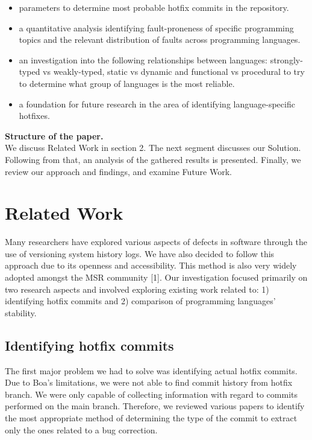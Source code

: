 \begin{itemize}
  \item parameters to determine most probable hotfix commits in the repository.
  \item a quantitative analysis identifying fault-proneness of specific programming topics and the relevant distribution of faults across programming languages.
  \item an investigation into the following relationships between languages: strongly-typed vs weakly-typed, static vs dynamic and functional vs procedural to try to determine what group of languages is the most reliable.
  \item a foundation for future research in the area of identifying language-specific hotfixes.
\end{itemize}
\par
\textbf{Structure of the paper.}\\
We discuss Related Work in section 2. The next segment discusses our Solution. Following from that, an analysis of the gathered results is presented. Finally, we review our approach and findings, and examine Future Work.


\section{Related Work}
Many researchers have explored various aspects of defects in software through the use of versioning system history logs. We have also decided to follow this approach due to its openness and accessibility. This method is also very widely adopted amongst the MSR community [1]. Our investigation focused primarily on two research aspects and involved exploring existing work related to: 1) identifying hotfix commits and 2) comparison of programming languages’ stability.


\subsection{Identifying hotfix commits}
The first major problem we had to solve was identifying actual hotfix commits. Due to Boa’s limitations, we were not able to find commit history from hotfix branch. We were only capable of collecting information with regard to commits performed on the main branch. Therefore, we reviewed various papers to identify the most appropriate method of determining the type of the commit to extract only the ones related to a bug correction.\par

